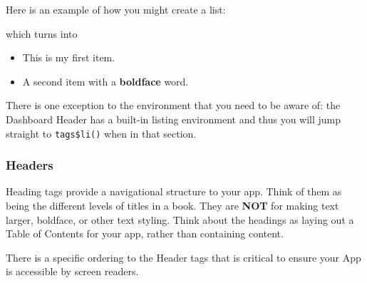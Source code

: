 \documentclass[]{book}
\newenvironment{Shaded}{\begin{snugshade}}{\end{snugshade}}
\newcommand{\KeywordTok}[1]{\textcolor[rgb]{0.13,0.29,0.53}{\textbf{#1}}}
\newcommand{\NormalTok}[1]{#1}
\newcommand{\OperatorTok}[1]{\textcolor[rgb]{0.81,0.36,0.00}{\textbf{#1}}}
\newcommand{\StringTok}[1]{\textcolor[rgb]{0.31,0.60,0.02}{#1}}
\providecommand{\tightlist}{%
  \setlength{\itemsep}{0pt}\setlength{\parskip}{0pt}}
\begin{document}
Here is an example of how you might create a list:

\begin{Shaded}
\end{Shaded}

which turns into

\begin{itemize}
\tightlist
\item
  This is my first item.
\item
  A second item with a \textbf{boldface} word.
\end{itemize}

There is one exception to the environment that you need to be aware of: the Dashboard Header has a built-in listing environment and thus you will jump straight to \texttt{tags\$li()} when in that section.

\hypertarget{headers}{%
\subsubsection{Headers}\label{headers}}

Heading tags provide a navigational structure to your app. Think of them as being the different levels of titles in a book. They are \textbf{NOT} for making text larger, boldface, or other text styling. Think about the headings as laying out a Table of Contents for your app, rather than containing content.

There is a specific ordering to the Header tags that is critical to ensure your App is accessible by screen readers.
\end{document}
